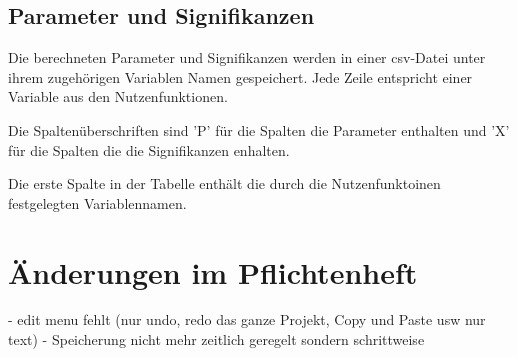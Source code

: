 \documentclass{article}
\begin{document}
\subsection{Parameter und Signifikanzen}
Die berechneten Parameter und Signifikanzen werden in einer csv-Datei unter ihrem zugehörigen Variablen Namen gespeichert. Jede Zeile entspricht einer Variable aus den Nutzenfunktionen.

Die Spaltenüberschriften sind 'P' für die Spalten die Parameter enthalten und 'X' für die Spalten die die Signifikanzen enhalten. 

Die erste Spalte in der Tabelle enthält die durch die Nutzenfunktoinen festgelegten Variablennamen.


\section{Änderungen im Pflichtenheft}
- edit menu fehlt (nur undo, redo das ganze Projekt, Copy und Paste usw nur text)
- Speicherung nicht mehr zeitlich geregelt sondern schrittweise
\end{document}
